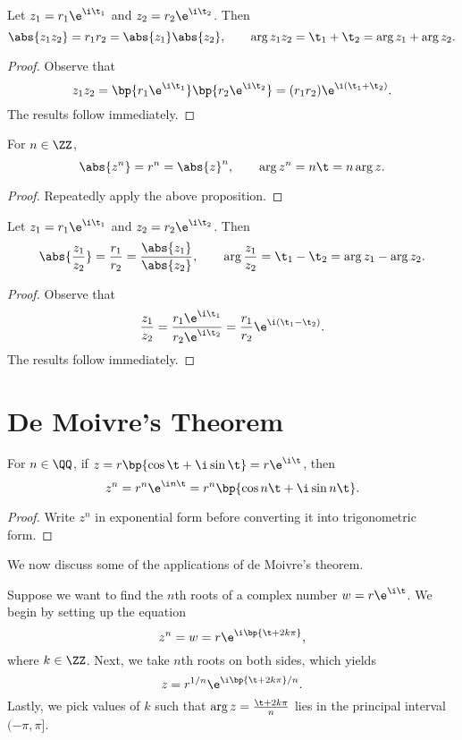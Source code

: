 \begin{proposition}
    Let $z_1 = r_1 \e^{\i \t_1}$ and $z_2 = r_2 \e^{\i \t_2}$. Then \[\abs{z_1 z_2} = r_1 r_2 = \abs{z_1} \abs{z_2}, \qquad \arg{z_1 z_2} = \t_1 + \t_2 = \arg{z_1} + \arg{z_2}.\]
\end{proposition}
\begin{proof}
    Observe that \[z_1 z_2 = \bp{r_1 \e^{\i \t_1}}\bp{r_2 \e^{\i \t_2}} = (r_1 r_2) \e^{\i (\t_1 + \t_2)}.\] The results follow immediately.
\end{proof}

\begin{corollary}
    For $n \in \ZZ$, \[\abs{z^n} = r^n = \abs{z}^n, \qquad \arg{z^n} = n \t = n \arg{z}.\]
\end{corollary}
\begin{proof}
    Repeatedly apply the above proposition.
\end{proof}

\begin{proposition}
    Let $z_1 = r_1 \e^{\i \t_1}$ and $z_2 = r_2 \e^{\i \t_2}$. Then \[\abs{\frac{z_1}{z_2}} = \frac{r_1}{r_2} = \frac{\abs{z_1}}{\abs{z_2}}, \qquad \arg{\frac{z_1}{z_2}} = \t_1 - \t_2 = \arg{z_1} - \arg{z_2}.\]
\end{proposition}
\begin{proof}
    Observe that \[\frac{z_1}{z_2} = \frac{r_1 \e^{\i \t_1}}{r_2 \e^{\i \t_2}} = \frac{r_1}{r_2} \e^{\i (\t_1 - \t_2)}.\] The results follow immediately.
\end{proof}

\section{De Moivre's Theorem}

\begin{theorem}
    For $n \in \QQ$, if $z = r\bp{\cos \t + \i \sin \t} = r \e^{\i \t}$, then \[z^n = r^n \e^{\i n \t} = r^n \bp{\cos n\t + \i \sin n\t}.\]
\end{theorem}
\begin{proof}
    Write $z^n$ in exponential form before converting it into trigonometric form.
\end{proof}

We now discuss some of the applications of de Moivre's theorem.

\begin{recipe}
    Suppose we want to find the $n$th roots of a complex number $w = r \e^{\i \t}$. We begin by setting up the equation \[z^n = w = r \e^{\i \bp{\t + 2k\pi}},\] where $k \in \ZZ$. Next, we take $n$th roots on both sides, which yields \[z = r^{1/n} \e^{\i \bp{\t + 2k\pi} /n}.\] Lastly, we pick values of $k$ such that $\arg z = \frac{\t + 2k\pi}{n}$ lies in the principal interval $(-\pi, \pi]$.
\end{recipe}

